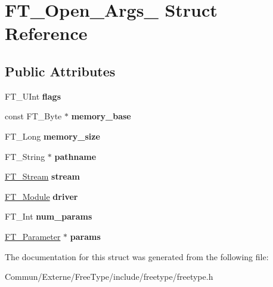 \hypertarget{struct_f_t___open___args__}{}\section{F\+T\+\_\+\+Open\+\_\+\+Args\+\_\+ Struct Reference}
\label{struct_f_t___open___args__}
\subsection*{Public Attributes}
\begin{DoxyCompactItemize}
\item 
F\+T\+\_\+\+U\+Int {\bfseries flags}\hypertarget{struct_f_t___open___args___a2e3e6b9284fe8b4d9833e247a19181fa}{}\label{struct_f_t___open___args___a2e3e6b9284fe8b4d9833e247a19181fa}

\item 
const F\+T\+\_\+\+Byte $\ast$ {\bfseries memory\+\_\+base}\hypertarget{struct_f_t___open___args___a1231da51bc58922096b3bc603bb2ffb0}{}\label{struct_f_t___open___args___a1231da51bc58922096b3bc603bb2ffb0}

\item 
F\+T\+\_\+\+Long {\bfseries memory\+\_\+size}\hypertarget{struct_f_t___open___args___a87f0bb2f257abe94c93a79e0de3525da}{}\label{struct_f_t___open___args___a87f0bb2f257abe94c93a79e0de3525da}

\item 
F\+T\+\_\+\+String $\ast$ {\bfseries pathname}\hypertarget{struct_f_t___open___args___aea3d454d9fd9bb7434aad07e651d027b}{}\label{struct_f_t___open___args___aea3d454d9fd9bb7434aad07e651d027b}

\item 
\hyperlink{struct_f_t___stream_rec__}{F\+T\+\_\+\+Stream} {\bfseries stream}\hypertarget{struct_f_t___open___args___ae1e6444bf0c21b323ce6cbe8bc475b2b}{}\label{struct_f_t___open___args___ae1e6444bf0c21b323ce6cbe8bc475b2b}

\item 
\hyperlink{struct_f_t___module_rec__}{F\+T\+\_\+\+Module} {\bfseries driver}\hypertarget{struct_f_t___open___args___a7c01bd7e34a440c3e89141ee521e2646}{}\label{struct_f_t___open___args___a7c01bd7e34a440c3e89141ee521e2646}

\item 
F\+T\+\_\+\+Int {\bfseries num\+\_\+params}\hypertarget{struct_f_t___open___args___afaf47d9e1631f2147b696fd7f5a6f4eb}{}\label{struct_f_t___open___args___afaf47d9e1631f2147b696fd7f5a6f4eb}

\item 
\hyperlink{struct_f_t___parameter__}{F\+T\+\_\+\+Parameter} $\ast$ {\bfseries params}\hypertarget{struct_f_t___open___args___a77b279a34beba29bc14901926f79818f}{}\label{struct_f_t___open___args___a77b279a34beba29bc14901926f79818f}

\end{DoxyCompactItemize}


The documentation for this struct was generated from the following file\+:\begin{DoxyCompactItemize}
\item 
Commun/\+Externe/\+Free\+Type/include/freetype/freetype.\+h\end{DoxyCompactItemize}
